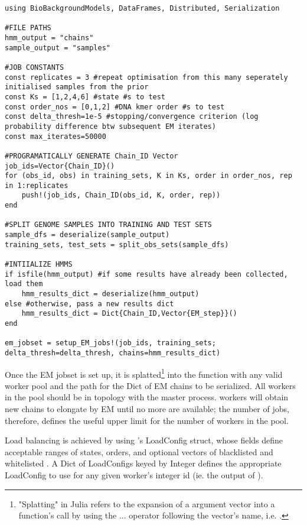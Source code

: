 \begin{verbatim}
using BioBackgroundModels, DataFrames, Distributed, Serialization

#FILE PATHS
hmm_output = "chains"
sample_output = "samples"

#JOB CONSTANTS
const replicates = 3 #repeat optimisation from this many seperately initialised samples from the prior
const Ks = [1,2,4,6] #state #s to test
const order_nos = [0,1,2] #DNA kmer order #s to test
const delta_thresh=1e-5 #stopping/convergence criterion (log probability difference btw subsequent EM iterates)
const max_iterates=50000

#PROGRAMATICALLY GENERATE Chain_ID Vector
job_ids=Vector{Chain_ID}()
for (obs_id, obs) in training_sets, K in Ks, order in order_nos, rep in 1:replicates
    push!(job_ids, Chain_ID(obs_id, K, order, rep))
end

#SPLIT GENOME SAMPLES INTO TRAINING AND TEST SETS
sample_dfs = deserialize(sample_output)
training_sets, test_sets = split_obs_sets(sample_dfs)

#INTIIALIZE HMMS
if isfile(hmm_output) #if some results have already been collected, load them
    hmm_results_dict = deserialize(hmm_output)
else #otherwise, pass a new results dict
    hmm_results_dict = Dict{Chain_ID,Vector{EM_step}}()
end

em_jobset = setup_EM_jobs!(job_ids, training_sets; delta_thresh=delta_thresh, chains=hmm_results_dict)
\end{verbatim}

Once the EM jobset is set up, it is splatted\footnote{"Splatting" in Julia refers to the expansion of a argument vector into a function's call by using the ... operator following the vector's name, i.e. .} into the  function with any valid worker pool and the path for the Dict of EM chains to be serialized. All workers in the pool should be in  topology with the master process.  workers will obtain new chains to elongate by EM until no more are available; the number of jobs, therefore, defines the useful upper limit for the number of workers in the pool.

Load balancing is achieved by using 's LoadConfig struct, whose fields define acceptable ranges of states, orders, and optional vectors of blacklisted and whitelisted . A Dict of LoadConfigs keyed by Integer defines the appropriate LoadConfig to use for any given worker's integer id (ie. the output of ).

